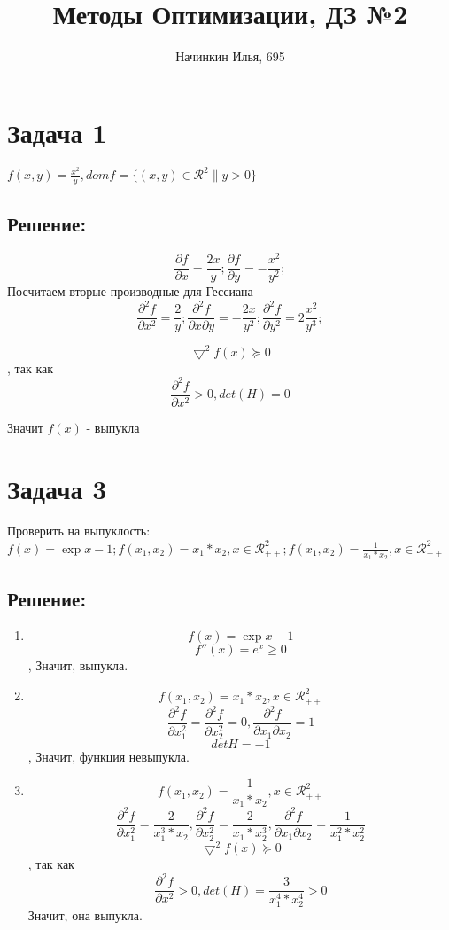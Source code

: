 \documentclass[a4paper]{article}
\title{Методы Оптимизации, ДЗ №2}
\author{Начинкин Илья, 695}
\begin{document}
\maketitle


\section*{Задача 1}
 $f(x,y) = \frac{x^2}{y}, domf = \{(x, y) \in \mathcal{R}^2  \| y > 0\}$
 \subsection*{Решение:}
 $$\frac{\partial f}{\partial x} = \frac{2x}{y} ;
    \frac{\partial f}{\partial y} = -\frac{x^2}{y^2} ; $$
Посчитаем вторые производные для Гессиана
$$    \frac{\partial^2 f}{\partial x^2} = \frac{2}{y} ;
    \frac{\partial^2 f}{\partial x \partial y} = -\frac{2x}{y^2} ;
    \frac{\partial^2 f}{\partial y^2} = 2\frac{x^2}{y^3} ;
 $$
 
 $$\bigtriangledown^2  f(x) \succeq 0$$, так как 
 $$\frac{\partial^2 f}{\partial x^2} > 0, det(H) = 0$$
 
 Значит $f(x)$ - выпукла


\section*{Задача 3}
Проверить на выпуклость: $f(x) = \exp{x} - 1 ;
f(x_1, x_2) = x_1*x_2 , x \in \mathcal{R}^{2}_{++} ; 
f(x_1, x_2) = \frac{1}{x_1*x_2} , x \in  \mathcal{R}^{2}_{++}$
\subsection*{Решение:}

\begin{enumerate}
    \item 
    $$f(x) = \exp{x} - 1$$
    $$f''(x) = e^x \geq 0$$, Значит, выпукла.
    \item
    $$f(x_1, x_2) = x_1*x_2 , x \in \mathcal{R}^{2}_{++}$$
    $$\frac{\partial^2 f}{\partial x_1^2} = \frac{\partial^2 f}{\partial x_2^2} = 0 , \frac{\partial^2 f}{\partial x_1 \partial x_2} = 1$$
    $$detH = -1$$, Значит, функция невыпукла.
    \item
    $$f(x_1, x_2) = \frac{1}{x_1*x_2} , x \in  \mathcal{R}^{2}_{++}$$
    $$\frac{\partial^2 f}{\partial x_1^2} = \frac{2}{x_1^3*x_2}, \frac{\partial^2 f}{\partial x_2^2} = \frac{2}{x_1*x_2^3}, \frac{\partial^2 f}{\partial x_1 \partial x_2} = \frac{1}{x_1^2*x_2^2}$$
    $$\bigtriangledown^2  f(x) \succeq 0$$, так как 
 $$\frac{\partial^2 f}{\partial x^2} > 0, det(H) = \frac{3}{x_1^4*x_2^4} > 0$$
 Значит, она выпукла.
\end{enumerate}
\end{document}
